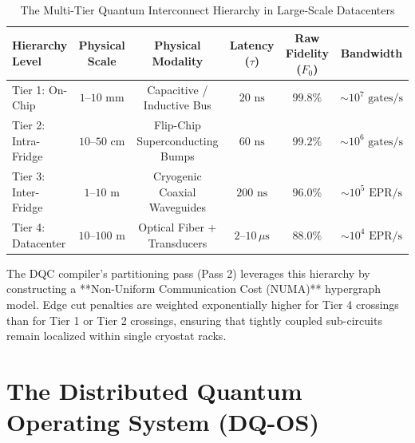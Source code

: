 \begin{table}[htbp]
    \centering
    \small
    \caption{The Multi-Tier Quantum Interconnect Hierarchy in Large-Scale Datacenters}
    \label{tab:interconnect_hierarchy}
    \begin{tabularx}{\textwidth}{lccccc}
        \toprule
        \textbf{Hierarchy Level} & \textbf{Physical Scale} & \textbf{Physical Modality} & \textbf{Latency ($\tau$)} & \textbf{Raw Fidelity ($F_0$)} & \textbf{Bandwidth} \\
        \midrule
        Tier 1: On-Chip & $1\text{--}10\text{ mm}$ & Capacitive / Inductive Bus & $20\text{ ns}$ & $99.8\%$ & $\sim 10^7\text{ gates/s}$ \\
        Tier 2: Intra-Fridge & $10\text{--}50\text{ cm}$ & Flip-Chip Superconducting Bumps & $60\text{ ns}$ & $99.2\%$ & $\sim 10^6\text{ gates/s}$ \\
        Tier 3: Inter-Fridge & $1\text{--}10\text{ m}$ & Cryogenic Coaxial Waveguides & $200\text{ ns}$ & $96.0\%$ & $\sim 10^5\text{ EPR/s}$ \\
        Tier 4: Datacenter & $10\text{--}100\text{ m}$ & Optical Fiber + Transducers & $2\text{--}10\,\mu\text{s}$ & $88.0\%$ & $\sim 10^4\text{ EPR/s}$ \\
        \bottomrule
    \end{tabularx}
\end{table}

The DQC compiler's partitioning pass (Pass 2) leverages this hierarchy by constructing a **Non-Uniform Communication Cost (NUMA)** hypergraph model. Edge cut penalties are weighted exponentially higher for Tier 4 crossings than for Tier 1 or Tier 2 crossings, ensuring that tightly coupled sub-circuits remain localized within single cryostat racks.

\section{The Distributed Quantum Operating System (DQ-OS)}
\label{sec:dq_os}

